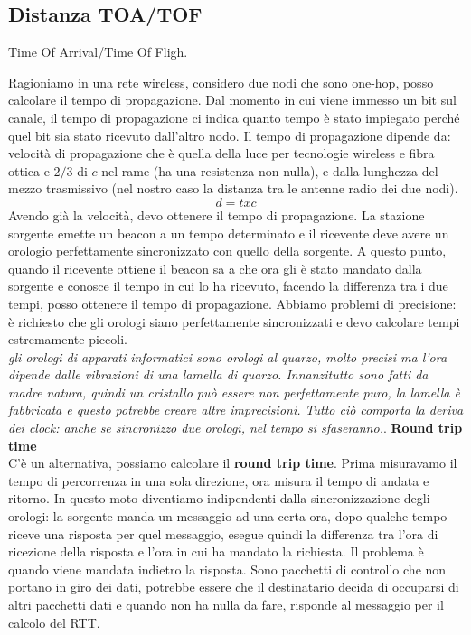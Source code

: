 \documentclass[12pt,italian]{report}
\begin{document}
\subsection{Distanza TOA/TOF}
Time Of Arrival/Time Of Fligh.

Ragioniamo in una rete wireless, considero due nodi che sono one-hop, posso calcolare il tempo di propagazione. Dal momento in cui viene immesso un bit sul canale, il tempo di propagazione ci indica quanto tempo è stato impiegato perché quel bit sia stato ricevuto dall'altro nodo. 
\bigbreak
Il tempo di propagazione dipende da: velocità di propagazione che è quella della luce per tecnologie wireless e fibra ottica e $2/3$ di $c$ nel rame (ha una resistenza non nulla), e dalla lunghezza del mezzo trasmissivo (nel nostro caso la distanza tra le antenne radio dei due nodi). 
\begin{equation}
    d = t x c
\end{equation}
Avendo già la velocità, devo ottenere il tempo di propagazione. La stazione sorgente emette un beacon a un tempo determinato e il ricevente deve avere un orologio perfettamente sincronizzato con quello della sorgente. A questo punto, quando il ricevente ottiene il beacon sa a che ora gli è stato mandato dalla sorgente e conosce il tempo in cui lo ha ricevuto, facendo la differenza tra i due tempi, posso ottenere il tempo di propagazione. 
\bigbreak
Abbiamo problemi di precisione: è richiesto che gli orologi siano perfettamente sincronizzati e devo calcolare tempi estremamente piccoli. \\ \textit{gli orologi di apparati informatici sono orologi al quarzo, molto precisi ma l'ora dipende dalle vibrazioni di una lamella di quarzo. Innanzitutto sono fatti da madre natura, quindi un cristallo può essere non perfettamente puro, la lamella è fabbricata e questo potrebbe creare altre imprecisioni. Tutto ciò comporta la deriva dei clock: anche se sincronizzo due orologi, nel tempo si sfaseranno.}. 
\bigbreak
\noindent \textbf{Round trip time} \\
\noindent C'è un alternativa, possiamo calcolare il \textbf{round trip time}. Prima misuravamo il tempo di percorrenza in una sola direzione, ora misura il tempo di andata e ritorno. In questo moto diventiamo indipendenti dalla sincronizzazione degli orologi: la sorgente manda un messaggio ad una certa ora, dopo qualche tempo riceve una risposta per quel messaggio, esegue quindi la differenza tra l'ora di ricezione della risposta e l'ora in cui ha mandato la richiesta.  
\bigbreak
Il problema è quando viene mandata indietro la risposta. Sono pacchetti di controllo che non portano in giro dei dati, potrebbe essere che il destinatario decida di occuparsi di altri pacchetti dati e quando non ha nulla da fare, risponde al messaggio per il calcolo del RTT. 
\end{document}
